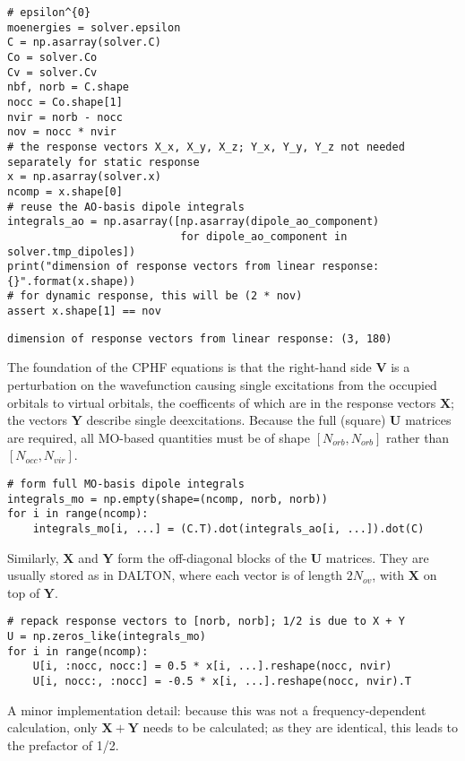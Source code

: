\documentclass[]{article}
\begin{document}
\begin{verbatim}
# epsilon^{0}
moenergies = solver.epsilon
C = np.asarray(solver.C)
Co = solver.Co
Cv = solver.Cv
nbf, norb = C.shape
nocc = Co.shape[1]
nvir = norb - nocc
nov = nocc * nvir
# the response vectors X_x, X_y, X_z; Y_x, Y_y, Y_z not needed separately for static response
x = np.asarray(solver.x)
ncomp = x.shape[0]
# reuse the AO-basis dipole integrals
integrals_ao = np.asarray([np.asarray(dipole_ao_component)
                           for dipole_ao_component in solver.tmp_dipoles])
print("dimension of response vectors from linear response: {}".format(x.shape))
# for dynamic response, this will be (2 * nov)
assert x.shape[1] == nov
\end{verbatim}

\begin{verbatim}
dimension of response vectors from linear response: (3, 180)
\end{verbatim}

The foundation of the CPHF equations is that the right-hand side
\(\mathbf{V}\) is a perturbation on the wavefunction causing single
excitations from the occupied orbitals to virtual orbitals, the
coefficents of which are in the response vectors \(\mathbf{X}\); the
vectors \(\mathbf{Y}\) describe single deexcitations. Because the full
(square) \(\mathbf{U}\) matrices are required, all MO-based quantities
must be of shape \([N_{orb}, N_{orb}]\) rather than
\([N_{occ}, N_{vir}]\).

\begin{verbatim}
# form full MO-basis dipole integrals
integrals_mo = np.empty(shape=(ncomp, norb, norb))
for i in range(ncomp):
    integrals_mo[i, ...] = (C.T).dot(integrals_ao[i, ...]).dot(C)
\end{verbatim}

Similarly, \(\mathbf{X}\) and \(\mathbf{Y}\) form the off-diagonal
blocks of the \(\mathbf{U}\) matrices. They are usually stored as in
DALTON, where each vector is of length \(2N_{ov}\), with \(\mathbf{X}\)
on top of \(\mathbf{Y}\).

\begin{verbatim}
# repack response vectors to [norb, norb]; 1/2 is due to X + Y
U = np.zeros_like(integrals_mo)
for i in range(ncomp):
    U[i, :nocc, nocc:] = 0.5 * x[i, ...].reshape(nocc, nvir)
    U[i, nocc:, :nocc] = -0.5 * x[i, ...].reshape(nocc, nvir).T
\end{verbatim}

A minor implementation detail: because this was not a
frequency-dependent calculation, only \(\mathbf{X}+\mathbf{Y}\) needs to
be calculated; as they are identical, this leads to the prefactor of
1/2.
\end{document}
